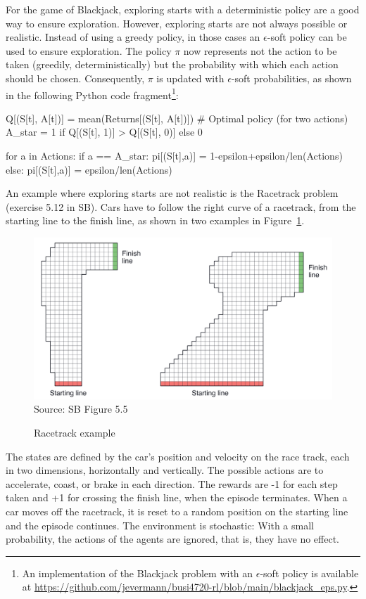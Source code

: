 For the game of Blackjack, exploring starts with a deterministic policy are a good way to ensure exploration. However, exploring starts are not always possible or realistic. Instead of using a greedy policy, in those cases an $\epsilon$-soft policy can be used to ensure exploration. The policy $\pi$ now represents not the action to be taken (greedily, deterministically) but the probability with which each action should be chosen. Consequently, $\pi$ is updated with $\epsilon$-soft probabilities, as shown in the following Python code fragment\footnote{An implementation of the Blackjack problem with an $\epsilon$-soft policy is available at \url{https://github.com/jevermann/busi4720-rl/blob/main/blackjack_eps.py}.}:

\begin{pythoncode}
Q[(S[t], A[t])] = mean(Returns[(S[t], A[t])])
# Optimal policy (for two actions)
A_star = 1 if Q[(S[t], 1)] > Q[(S[t], 0)] else 0

for a in Actions:
    if a == A_star:
        pi[(S[t],a)] = 1-epsilon+epsilon/len(Actions)
    else:
        pi[(S[t],a)] = epsilon/len(Actions)
\end{pythoncode}

An example where exploring starts are not realistic is the Racetrack problem (exercise 5.12 in SB). Cars have to follow the right curve of a racetrack, from the starting line to the finish line, as shown in two examples in Figure~\ref{fig:racetrack}.

\begin{figure}
\centering
\includegraphics[width=.75\textwidth]{screen5.png} \\
\scriptsize Source: SB Figure 5.5 \normalsize
\caption{Racetrack example}
\label{fig:racetrack}
\end{figure}

The states are defined by the car's position and velocity on the race track, each in two dimensions, horizontally and vertically. The possible actions are to accelerate, coast, or brake in each direction. The rewards are -1 for each step taken and +1 for crossing the finish line, when the episode terminates. When a car moves off the racetrack, it is reset to a random position on the starting line and the episode continues. The environment is stochastic: With a small probability, the actions of the agents are ignored, that is, they have no effect.

